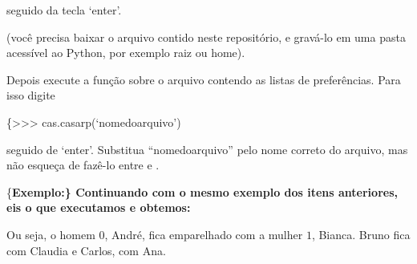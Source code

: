 \documentclass[11pt]{article}
\begin{document}

seguido da tecla `enter'.

(você precisa baixar o arquivo  contido neste
repositório, e gravá-lo em uma pasta acessível ao Python, por exemplo raiz ou home).

Depois execute a função  sobre o arquivo contendo as listas de 
preferências. Para isso digite

\verbatim\{>>> cas.casarp(`nomedoarquivo')

seguido de `enter'. Substitua ``nomedoarquivo'' pelo nome correto do arquivo, mas 
não esqueça de fazê-lo entre  e .

\{\bf Exemplo:\} Continuando com o mesmo exemplo dos itens anteriores, eis o que
executamos e obtemos:


Ou seja, o homem $0$, André, fica emparelhado com a mulher $1$, Bianca. Bruno fica
com Claudia e Carlos, com Ana.
\end{document}
